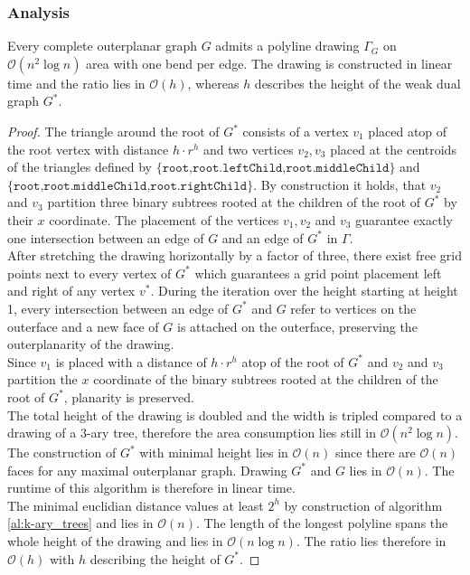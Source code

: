 \subsubsection{Analysis}

\begin{lemma}
	Every complete outerplanar graph $G$ admits a polyline drawing $\Gamma_G$ on $\mathcal{O}(n^2 \log n)$ area with one bend per edge. The drawing is constructed in linear time and the ratio lies in $\mathcal{O}(h)$, whereas $h$ describes the height of the weak dual graph $G^*$.
\end{lemma}

\begin{proof}
	The triangle around the root of $G^*$ consists of a vertex $v_1$ placed atop of the root vertex with distance $h\cdot r^h$ and two vertices $v_2,v_3$ placed at the centroids of the triangles defined by $\{\texttt{root,root.leftChild,root.middleChild}\}$ and $\{\texttt{root,root.middleChild,root.rightChild}\}$. By construction it holds, that $v_2$ and $v_3$ partition three binary subtrees rooted at the children of the root of $G^*$ by their $x$ coordinate. The placement of the vertices $v_1,v_2$ and $v_3$ guarantee exactly one intersection between an edge of $G$ and an edge of $G^*$ in $\Gamma$.\\
	After stretching the drawing horizontally by a factor of three, there exist free grid points next to every vertex of $G^*$ which guarantees a grid point placement left and right of any vertex $v^*$. During the iteration over the height starting at height 1, every intersection between an edge of $G^*$ and $G$ refer to vertices on the outerface and a new face of $G$ is attached on the outerface, preserving the outerplanarity of the drawing.\\
	Since $v_1$ is placed with a distance of $h\cdot r^h$ atop of the root of $G^*$ and $v_2$ and $v_3$ partition the $x$ coordinate of the binary subtrees rooted at the children of the root of $G^*$, planarity is preserved.\\
	The total height of the drawing is doubled and the width is tripled compared to a drawing of a $3$-ary tree, therefore the area consumption lies still in $\mathcal{O}(n^2 \log n)$.\\
	The construction of $G^*$ with minimal height lies in $\mathcal{O}(n)$ since there are $\mathcal{O}(n)$ faces for any maximal outerplanar graph. Drawing $G^*$ and $G$ lies in $\mathcal{O}(n)$. The runtime of this algorithm is therefore in linear time.\\
	The minimal euclidian distance values at least $2^h$ by construction of algorithm \ref{al:k-ary_trees} and lies in $\mathcal{O}(n)$. The length of the longest polyline spans the whole height of the drawing and lies in $\mathcal{O}(n \log n)$. The ratio lies therefore in $\mathcal{O}(h)$ with $h$ describing the height of $G^*$.
\end{proof}
